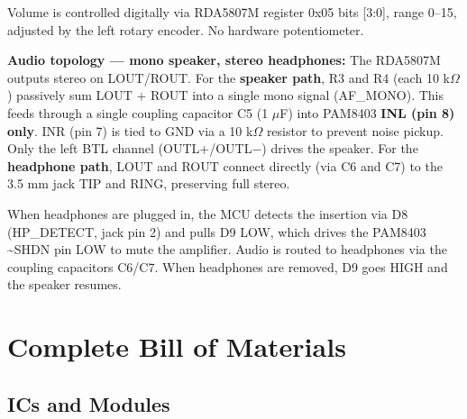 \documentclass[a4paper,11pt]{article}
\renewcommand*{\,}{ }%
\begin{document}
Volume is controlled digitally via RDA5807M register 0x05 bits [3:0], range 0--15, adjusted by the left rotary encoder. No hardware potentiometer.

\begin{infobox}
\textbf{Audio topology --- mono speaker, stereo headphones:} The RDA5807M outputs stereo on LOUT/ROUT. For the \textbf{speaker path}, R3 and R4 (each 10\,k$\Omega$) passively sum LOUT + ROUT into a single mono signal (AF\_MONO). This feeds through a single coupling capacitor C5 (1\,$\mu$F) into PAM8403 \textbf{INL (pin 8) only}. INR (pin 7) is tied to GND via a 10\,k$\Omega$ resistor to prevent noise pickup. Only the left BTL channel (OUTL+/OUTL$-$) drives the speaker. For the \textbf{headphone path}, LOUT and ROUT connect directly (via C6 and C7) to the 3.5\,mm jack TIP and RING, preserving full stereo.
\end{infobox}

When headphones are plugged in, the MCU detects the insertion via D8 (HP\_DETECT, jack pin 2) and pulls D9 LOW, which drives the PAM8403 \textasciitilde{}SHDN pin LOW to mute the amplifier. Audio is routed to headphones via the coupling capacitors C6/C7. When headphones are removed, D9 goes HIGH and the speaker resumes.

\section{Complete Bill of Materials}

\subsection{ICs and Modules}
\end{document}
